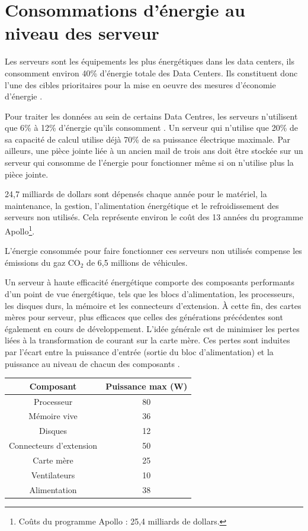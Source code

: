 \section{Consommations d'énergie au niveau des serveur}
\begin{onehalfspace}
Les serveurs sont les équipements les plus énergétiques dans les data centers, ils consomment environ 40\% d’énergie totale des Data Centers. Ils constituent donc l’une des cibles prioritaires pour la mise en oeuvre des mesures d’économie d’énergie \cite{WEB47}.\medskip 

Pour traiter les données au sein de certains Data Centres, les serveurs n’utilisent que 6\% à 12\% d’énergie qu’ils consomment \cite{ref6}. Un serveur qui n’utilise que 20\% de sa capacité de calcul utilise déjà 70\% de sa puissance électrique maximale. Par ailleurs, une pièce jointe liée à un ancien mail de trois ans doit être stockée sur un serveur qui consomme de l’énergie pour fonctionner même si on  n’utilise plus la pièce jointe.\medskip 

24,7 milliards de dollars sont dépensés chaque année pour le matériel, la maintenance, la gestion, l’alimentation énergétique et le refroidissement des serveurs non utilisés. Cela représente environ le coût des 13 années du programme Apollo\footnote{Coûts du programme Apollo : 25,4 milliards de dollars.}\cite{ref8}.\medskip 

L’énergie consommée pour faire fonctionner ces serveurs non utilisés  compense les émissions du gaz CO$_{2}$ de 6,5 millions de véhicules.\medskip 

Un serveur à haute efficacité énergétique comporte des composants performants d’un point de vue énergétique, tels que les blocs d’alimentation, les processeurs, les disques durs, la mémoire et les connecteurs d’extension. À cette fin, des cartes mères pour serveur, plus efficaces que celles des générations précédentes sont également en cours de développement. L’idée générale est de minimiser les pertes liées à la transformation de courant sur la carte mère. Ces pertes sont  induites par l’écart entre la puissance d’entrée (sortie du bloc d’alimentation) et la puissance au niveau de chacun des composants \cite{WEB47}.


\begin{center}
\begin{tabular}{|c||c|}
\hline
\textbf{Composant} & \textbf{Puissance max (W)} \\
\hline
Processeur & 80 \\
\hline
Mémoire vive & 36 \\
\hline
Disques & 12 \\
\hline
Connecteurs d'extension & 50 \\
\hline
Carte mère & 25 \\
\hline
Ventilateurs & 10 \\
\hline
Alimentation & 38 \\
\hline
\end{tabular}
\label{tab1}
\end{center}



\end{onehalfspace}

